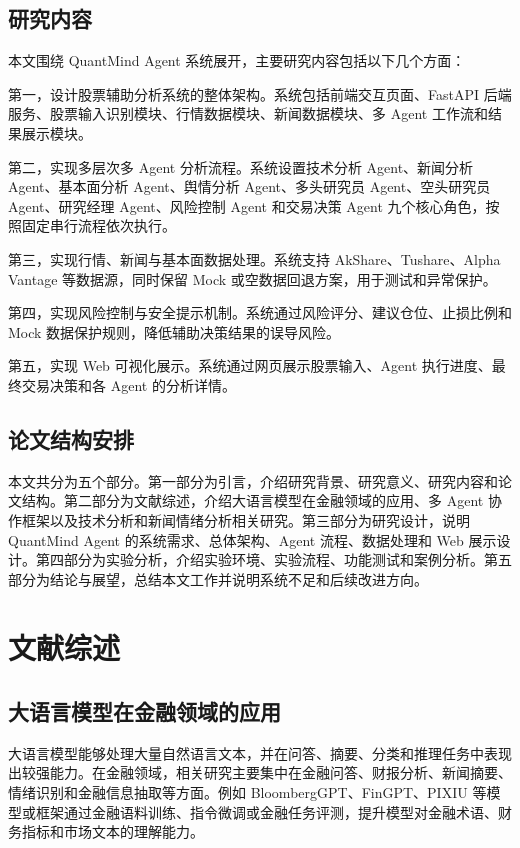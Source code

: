 \documentclass[UTF8,a4paper,12pt]{ctexart}
\begin{document}
\subsection{研究内容}

本文围绕 QuantMind Agent 系统展开，主要研究内容包括以下几个方面：

第一，设计股票辅助分析系统的整体架构。系统包括前端交互页面、FastAPI 后端服务、股票输入识别模块、行情数据模块、新闻数据模块、多 Agent 工作流和结果展示模块。

第二，实现多层次多 Agent 分析流程。系统设置技术分析 Agent、新闻分析 Agent、基本面分析 Agent、舆情分析 Agent、多头研究员 Agent、空头研究员 Agent、研究经理 Agent、风险控制 Agent 和交易决策 Agent 九个核心角色，按照固定串行流程依次执行。

第三，实现行情、新闻与基本面数据处理。系统支持 AkShare、Tushare、Alpha Vantage 等数据源，同时保留 Mock 或空数据回退方案，用于测试和异常保护。

第四，实现风险控制与安全提示机制。系统通过风险评分、建议仓位、止损比例和 Mock 数据保护规则，降低辅助决策结果的误导风险。

第五，实现 Web 可视化展示。系统通过网页展示股票输入、Agent 执行进度、最终交易决策和各 Agent 的分析详情。

\subsection{论文结构安排}

本文共分为五个部分。第一部分为引言，介绍研究背景、研究意义、研究内容和论文结构。第二部分为文献综述，介绍大语言模型在金融领域的应用、多 Agent 协作框架以及技术分析和新闻情绪分析相关研究。第三部分为研究设计，说明 QuantMind Agent 的系统需求、总体架构、Agent 流程、数据处理和 Web 展示设计。第四部分为实验分析，介绍实验环境、实验流程、功能测试和案例分析。第五部分为结论与展望，总结本文工作并说明系统不足和后续改进方向。

\section{文献综述}

\subsection{大语言模型在金融领域的应用}

大语言模型能够处理大量自然语言文本，并在问答、摘要、分类和推理任务中表现出较强能力。在金融领域，相关研究主要集中在金融问答、财报分析、新闻摘要、情绪识别和金融信息抽取等方面。例如 BloombergGPT、FinGPT、PIXIU 等模型或框架通过金融语料训练、指令微调或金融任务评测，提升模型对金融术语、财务指标和市场文本的理解能力。
\end{document}

